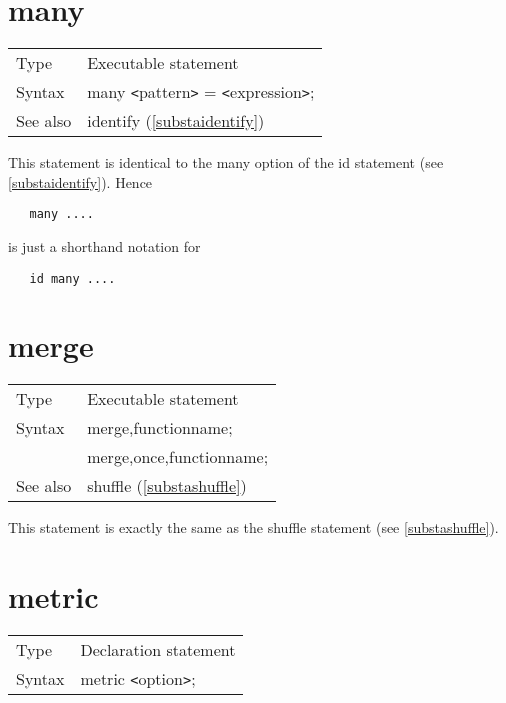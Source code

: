  
\section{many}
\label{substamany}

\noindent \begin{tabular}{ll}
Type & Executable statement\\
Syntax & many {\tt<}pattern{\tt>} = {\tt<}expression{\tt>};
\\ See also & identify (\ref{substaidentify})
\end{tabular} \vspace{4mm}

\noindent This statement is identical to the many option of the 
id statement (see \ref{substaidentify}). Hence
\begin{verbatim}
   many ....
\end{verbatim}
is just a shorthand notation for
\begin{verbatim}
   id many ....
\end{verbatim}
\vspace{10mm}

%
\section{merge}
\label{substamerge}

\noindent \begin{tabular}{ll}
Type & Executable statement\\
Syntax & merge,functionname; \\
       & merge,once,functionname;
\\ See also & shuffle (\ref{substashuffle})
\end{tabular} \vspace{4mm}

\noindent This statement is exactly the same as the shuffle 
statement (see \ref{substashuffle}).
\vspace{10mm}
%

\section{metric}
\label{substametric}

\noindent \begin{tabular}{ll}
Type & Declaration statement\\
Syntax & metric {\tt<}option{\tt>};
\end{tabular}
\smallskip


